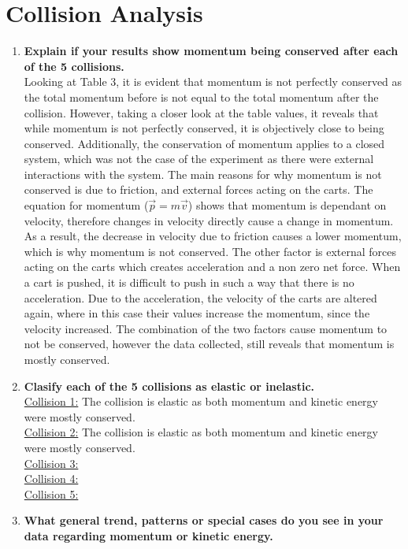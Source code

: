 \documentclass[12pt,letterpaper]{article}
\begin{document}
\section{Collision Analysis}
\begin{enumerate}
	\item \textbf{Explain if your results show momentum being conserved after each of the 5 collisions.}\\
	      Looking at Table 3, it is evident that momentum is not perfectly conserved as the total momentum before is not equal to the total momentum after the collision.
	      However, taking a closer look at the table values, it reveals that while momentum is not perfectly conserved, it is objectively close to being conserved.
	      Additionally, the conservation of momentum applies to a closed system, which was not the case of the experiment as there were external interactions with the system.
	      The main reasons for why momentum is not conserved is due to friction, and external forces acting on the carts.
	      The equation for momentum ($\vec{p} = m\vec{v}$) shows that momentum is dependant on velocity, therefore changes in velocity directly cause a change in momentum.
	      As a result, the decrease in velocity due to friction causes a lower momentum, which is why momentum is not conserved.
	      The other factor is external forces acting on the carts which creates acceleration and a non zero net force.
	      When a cart is pushed, it is difficult to push in such a way that there is no acceleration.
	      Due to the acceleration, the velocity of the carts are altered again, where in this case their values increase the momentum, since the velocity increased.
	      The combination of the two factors cause momentum to not be conserved, however the data collected, still reveals that momentum is mostly conserved.
	\item \textbf{Clasify each of the 5 collisions as elastic or inelastic.}\\
	      \underline{Collision 1:} The collision is elastic as both momentum and kinetic energy were mostly conserved.\\
	      \underline{Collision 2:} The collision is elastic as both momentum and kinetic energy were mostly conserved.\\
	      \underline{Collision 3:}\\
	      \underline{Collision 4:}\\
	      \underline{Collision 5:}
	\item \textbf{What general trend, patterns or special cases do you see in your data regarding momentum or kinetic energy.}
\end{enumerate}
\end{document}
